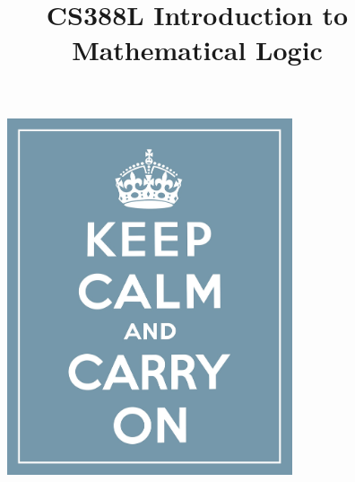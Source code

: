 \documentclass[12pt]{article}
\begin{document}
\title{CS388L Introduction to Mathematical Logic}
\date{}

\begin{titlepage}
\maketitle
\thispagestyle{empty}
\begin{figure}[H]
\centering
\includegraphics[width=0.75\textwidth]{keep-calm-and-carry-on.jpg}
\label{overflow}
\end{figure}
\newpage
\tableofcontents
\end{titlepage}








\end{document}
